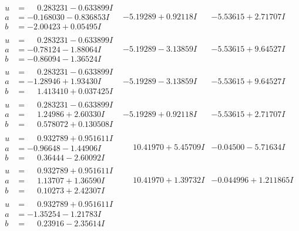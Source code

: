 \documentclass[1p]{elsarticle_modified}
\theoremstyle{definition}
\begin{document}
$$\begin{array}{c|c|c}
\begin{aligned}
u &= \phantom{-}0.283231 - 0.633899 I \\
a &= -0.168030 - 0.836853 I \\
b &= -2.00423 + 0.05495 I\end{aligned}
 & -5.19289 + 0.92118 I & -5.53615 + 2.71707 I \\ \hline\begin{aligned}
u &= \phantom{-}0.283231 - 0.633899 I \\
a &= -0.78124 - 1.88064 I \\
b &= -0.86094 - 1.36524 I\end{aligned}
 & -5.19289 - 3.13859 I & -5.53615 + 9.64527 I \\ \hline\begin{aligned}
u &= \phantom{-}0.283231 - 0.633899 I \\
a &= -1.28946 + 1.93430 I \\
b &= \phantom{-}1.413410 + 0.037425 I\end{aligned}
 & -5.19289 - 3.13859 I & -5.53615 + 9.64527 I \\ \hline\begin{aligned}
u &= \phantom{-}0.283231 - 0.633899 I \\
a &= \phantom{-}1.24986 + 2.60330 I \\
b &= \phantom{-}0.578072 + 0.130508 I\end{aligned}
 & -5.19289 + 0.92118 I & -5.53615 + 2.71707 I \\ \hline\begin{aligned}
u &= \phantom{-}0.932789 + 0.951611 I \\
a &= -0.96648 - 1.44906 I \\
b &= \phantom{-}0.36444 - 2.60092 I\end{aligned}
 & \phantom{-}10.41970 + 5.45709 I & -0.04500 - 5.71634 I \\ \hline\begin{aligned}
u &= \phantom{-}0.932789 + 0.951611 I \\
a &= \phantom{-}1.13707 + 1.36590 I \\
b &= \phantom{-}0.10273 + 2.42307 I\end{aligned}
 & \phantom{-}10.41970 + 1.39732 I & -0.044996 + 1.211865 I \\ \hline\begin{aligned}
u &= \phantom{-}0.932789 + 0.951611 I \\
a &= -1.35254 - 1.21783 I \\
b &= \phantom{-}0.23916 - 2.35614 I\end{aligned}

\end{array}$$
\end{document}
